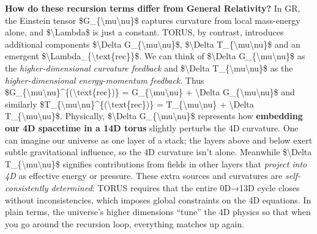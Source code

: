 \documentclass[
]{article}
\begin{document}
{\textbf{How do these recursion terms differ from General Relativity?} In
GR, the Einstein tensor \$G\_\{\textbackslash mu\textbackslash nu\}\$
captures curvature from local mass-energy alone, and
\$\textbackslash Lambda\$ is just a constant. TORUS, by contrast,
introduces additional components \$\textbackslash Delta
G\_\{\textbackslash mu\textbackslash nu\}\$, \$\textbackslash Delta
T\_\{\textbackslash mu\textbackslash nu\}\$ and an emergent
\$\textbackslash Lambda\_\{\textbackslash text\{rec\}\}\$. We can think
of \$\textbackslash Delta G\_\{\textbackslash mu\textbackslash nu\}\$ as
the \emph{higher-dimensional curvature feedback} and
\$\textbackslash Delta T\_\{\textbackslash mu\textbackslash nu\}\$ as
the \emph{higher-dimensional energy-momentum feedback}. Thus
\$G\_\{\textbackslash mu\textbackslash nu\}\^{}\{(\textbackslash text\{rec\})\}
= G\_\{\textbackslash mu\textbackslash nu\} + \textbackslash Delta
G\_\{\textbackslash mu\textbackslash nu\}\$ and similarly
\$T\_\{\textbackslash mu\textbackslash nu\}\^{}\{(\textbackslash text\{rec\})\}
= T\_\{\textbackslash mu\textbackslash nu\} + \textbackslash Delta
T\_\{\textbackslash mu\textbackslash nu\}\$\hspace{0pt}. Physically,
\$\textbackslash Delta G\_\{\textbackslash mu\textbackslash nu\}\$
represents how \textbf{embedding our 4D spacetime in a 14D torus}
slightly perturbs the 4D curvature. One can imagine our universe as one
layer of a stack; the layers above and below exert subtle gravitational
influence, so the 4D curvature isn't alone\hspace{0pt}. Meanwhile
\$\textbackslash Delta T\_\{\textbackslash mu\textbackslash nu\}\$
signifies contributions from fields in other layers that \emph{project
into 4D} as effective energy or pressure\hspace{0pt}. These extra
sources and curvatures are \emph{self-consistently determined}: TORUS
requires that the entire 0D→13D cycle closes without inconsistencies,
which imposes global constraints on the 4D equations\hspace{0pt}. In
plain terms, the universe's higher dimensions ``tune'' the 4D physics so
that when you go around the recursion loop, everything matches up again.

}
\end{document}
